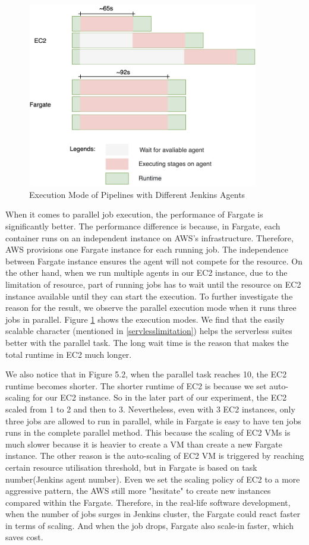 \begin{figure}[!h]
  \centering
  \includegraphics[width=0.90\textwidth]{pics/parallel.png}
  \caption{Execution Mode of Pipelines with Different Jenkins Agents}
  \label{fig:parallel}
  \end{figure}
\par
When it comes to parallel job execution, the performance of Fargate is significantly better. The performance difference is because, in Fargate, each container runs on an independent instance on AWS's infrastructure. Therefore, AWS provisions one Fargate instance for each running job. The independence between Fargate instance ensures the agent will not compete for the resource. On the other hand, when we run multiple agents in our EC2 instance, due to the limitation of resource, part of running jobs has to wait until the resource on EC2 instance available until they can start the execution. To further investigate the reason for the result, we observe the parallel execution mode when it runs three jobs in parallel. Figure \ref{fig:parallel} shows the execution modes. We find that the easily scalable character (mentioned in \ref{servlesslimitation}) helps the serverless suites better with the parallel task. The long wait time is the reason that makes the total runtime in EC2 much longer.
\par
We also notice that in Figure 5.2, when the parallel task reaches 10, the EC2 runtime becomes shorter. The shorter runtime of EC2 is because we set auto-scaling for our EC2 instance. So in the later part of our experiment, the EC2 scaled from 1 to 2 and then to 3. Nevertheless, even with 3 EC2 instances, only three jobs are allowed to run in parallel, while in Fargate is easy to have ten jobs runs in the complete parallel method. This because the scaling of EC2 VMs is much slower because it is heavier to create a VM than create a new Fargate instance. The other reason is the auto-scaling of EC2 VM is triggered by reaching certain resource utilisation threshold, but in Fargate is based on task number(Jenkins agent number). Even we set the scaling policy of EC2 to a more aggressive pattern, the AWS still more "hesitate" to create new instances compared within the Fargate. 
Therefore, in the real-life software development, when the number of jobs surges in Jenkins cluster, the Fargate could react faster in terms of scaling. And when the job drops, Fargate also scale-in faster, which saves cost.
